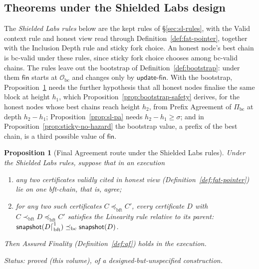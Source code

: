 \documentclass[11pt,a4paper]{article}
\newtheorem{proposition}[theorem]{Proposition}
\theoremstyle{definition}
\newcommand{\bc}{\mathrm{bc}}
\newcommand{\bft}{\mathrm{bft}}
\newcommand{\Origin}{\mathcal{O}}
\newcommand{\Obc}{\Origin_{\bc}}
\newcommand{\preceqbc}{\preceq_{\bc}}
\newcommand{\preceqbft}{\preceq_{\bft}}
\newcommand{\precbft}{\prec_{\bft}}
\newcommand{\Pibc}{\Pi_{\bc}}
\newcommand{\snapshot}{\mathsf{snapshot}}
\newcommand{\fin}{\mathsf{fin}}
\newcommand{\updatefin}{\mathsf{update\text{-}fin}}
\begin{document}
\subsection{Theorems under the Shielded Labs design}\label{sec:sl-theorems}

The \emph{Shielded Labs rules} below are the kept rules of
\S\ref{sec:sl-rules}, with the Valid context rule and honest view read
through Definition~\ref{def:fat-pointer}, together with the Inclusion Depth
rule and sticky fork choice. An honest node's best chain is bc-valid under
these rules, since sticky fork choice chooses among bc-valid chains. The
rules leave out the bootstrap of Definition~\ref{def:bootstrap}: under them
$\fin$ starts at $\Obc$ and changes only by $\updatefin$. With the bootstrap,
Proposition~\ref{prop:sl-fa} needs the further hypothesis that all honest
nodes finalise the same block at height $h_1$, which
Proposition~\ref{prop:bootstrap-safety} derives, for the honest nodes whose
best chains reach height $h_2$, from Prefix Agreement of $\Pibc$ at depth
$h_2 - h_1$; Proposition~\ref{prop:sl-pa} needs $h_2 - h_1 \ge \sigma$; and in
Proposition~\ref{prop:sticky-no-hazard} the bootstrap value, a prefix of the
best chain, is a third possible value of $\fin$.

\begin{proposition}[Final Agreement route under the Shielded Labs rules]
\label{prop:sl-fa}
Under the Shielded Labs rules, suppose that in an execution
\begin{enumerate}[label=(\alph*)]
\item any two certificates validly cited in honest view
  (Definition~\ref{def:fat-pointer}) lie on one bft-chain, that is, agree;
\item for any two such certificates $C \preceqbft C'$, every certificate $D$
  with $C \precbft D \preceqbft C'$ satisfies the Linearity rule relative to
  its parent: $\snapshot(D\trunc[\bft]{1}) \preceqbc \snapshot(D)$.
\end{enumerate}
Then Assured Finality (Definition~\ref{def:af}) holds in the execution.

Status: proved (this volume), of a designed-but-unspecified construction.
\end{proposition}
\end{document}
